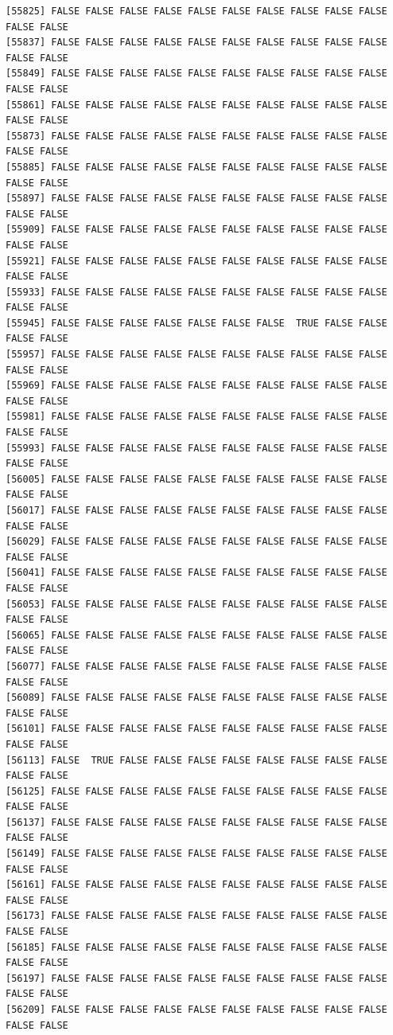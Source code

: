 \documentclass[
  a4paper,
  DIV=11,
  numbers=noendperiod]{scrartcl}
\begin{document}
\begin{verbatim}
[55825] FALSE FALSE FALSE FALSE FALSE FALSE FALSE FALSE FALSE FALSE FALSE FALSE
[55837] FALSE FALSE FALSE FALSE FALSE FALSE FALSE FALSE FALSE FALSE FALSE FALSE
[55849] FALSE FALSE FALSE FALSE FALSE FALSE FALSE FALSE FALSE FALSE FALSE FALSE
[55861] FALSE FALSE FALSE FALSE FALSE FALSE FALSE FALSE FALSE FALSE FALSE FALSE
[55873] FALSE FALSE FALSE FALSE FALSE FALSE FALSE FALSE FALSE FALSE FALSE FALSE
[55885] FALSE FALSE FALSE FALSE FALSE FALSE FALSE FALSE FALSE FALSE FALSE FALSE
[55897] FALSE FALSE FALSE FALSE FALSE FALSE FALSE FALSE FALSE FALSE FALSE FALSE
[55909] FALSE FALSE FALSE FALSE FALSE FALSE FALSE FALSE FALSE FALSE FALSE FALSE
[55921] FALSE FALSE FALSE FALSE FALSE FALSE FALSE FALSE FALSE FALSE FALSE FALSE
[55933] FALSE FALSE FALSE FALSE FALSE FALSE FALSE FALSE FALSE FALSE FALSE FALSE
[55945] FALSE FALSE FALSE FALSE FALSE FALSE FALSE  TRUE FALSE FALSE FALSE FALSE
[55957] FALSE FALSE FALSE FALSE FALSE FALSE FALSE FALSE FALSE FALSE FALSE FALSE
[55969] FALSE FALSE FALSE FALSE FALSE FALSE FALSE FALSE FALSE FALSE FALSE FALSE
[55981] FALSE FALSE FALSE FALSE FALSE FALSE FALSE FALSE FALSE FALSE FALSE FALSE
[55993] FALSE FALSE FALSE FALSE FALSE FALSE FALSE FALSE FALSE FALSE FALSE FALSE
[56005] FALSE FALSE FALSE FALSE FALSE FALSE FALSE FALSE FALSE FALSE FALSE FALSE
[56017] FALSE FALSE FALSE FALSE FALSE FALSE FALSE FALSE FALSE FALSE FALSE FALSE
[56029] FALSE FALSE FALSE FALSE FALSE FALSE FALSE FALSE FALSE FALSE FALSE FALSE
[56041] FALSE FALSE FALSE FALSE FALSE FALSE FALSE FALSE FALSE FALSE FALSE FALSE
[56053] FALSE FALSE FALSE FALSE FALSE FALSE FALSE FALSE FALSE FALSE FALSE FALSE
[56065] FALSE FALSE FALSE FALSE FALSE FALSE FALSE FALSE FALSE FALSE FALSE FALSE
[56077] FALSE FALSE FALSE FALSE FALSE FALSE FALSE FALSE FALSE FALSE FALSE FALSE
[56089] FALSE FALSE FALSE FALSE FALSE FALSE FALSE FALSE FALSE FALSE FALSE FALSE
[56101] FALSE FALSE FALSE FALSE FALSE FALSE FALSE FALSE FALSE FALSE FALSE FALSE
[56113] FALSE  TRUE FALSE FALSE FALSE FALSE FALSE FALSE FALSE FALSE FALSE FALSE
[56125] FALSE FALSE FALSE FALSE FALSE FALSE FALSE FALSE FALSE FALSE FALSE FALSE
[56137] FALSE FALSE FALSE FALSE FALSE FALSE FALSE FALSE FALSE FALSE FALSE FALSE
[56149] FALSE FALSE FALSE FALSE FALSE FALSE FALSE FALSE FALSE FALSE FALSE FALSE
[56161] FALSE FALSE FALSE FALSE FALSE FALSE FALSE FALSE FALSE FALSE FALSE FALSE
[56173] FALSE FALSE FALSE FALSE FALSE FALSE FALSE FALSE FALSE FALSE FALSE FALSE
[56185] FALSE FALSE FALSE FALSE FALSE FALSE FALSE FALSE FALSE FALSE FALSE FALSE
[56197] FALSE FALSE FALSE FALSE FALSE FALSE FALSE FALSE FALSE FALSE FALSE FALSE
[56209] FALSE FALSE FALSE FALSE FALSE FALSE FALSE FALSE FALSE FALSE FALSE FALSE

\end{verbatim}
\end{document}
